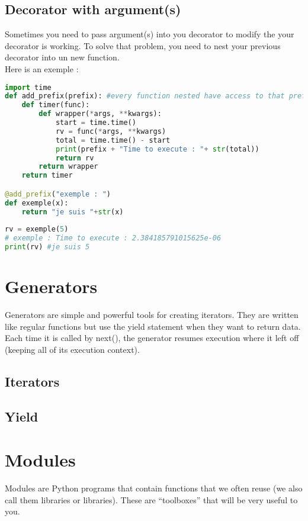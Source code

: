 \documentclass[a4paper, 12pt, titlepage]{scrartcl} %
\begin{document}
\subsection{Decorator with argument(s)}
Sometimes you need to pass argument(s) into you decorator to modify the your decorator is working. To solve that problem, you need to nest your previous decorator into un new function. \\
Here is an exemple : \\
\begin{lstlisting}[language=Python]
import time
def add_prefix(prefix): #every function nested have access to that prefix
    def timer(func):
    	def wrapper(*args, **kwargs):
    		start = time.time()
    		rv = func(*args, **kwargs)
    		total = time.time() - start
    		print(prefix + "Time to execute : "+ str(total))
    		return rv
    	return wrapper
    return timer

@add_prefix("exemple : ")
def exemple(x):
	return "je suis "+str(x)
	
rv = exemple(5)
# exemple : Time to execute : 2.384185791015625e-06
print(rv) #je suis 5
\end{lstlisting}

\newpage
\section{Generators}
\label{sec:Generators}
Generators are simple and powerful tools for creating iterators. They are written like regular functions but use the yield statement when they want to return data. Each time it is called by next(), the generator resumes execution where it left off (keeping all of its execution context).\newline
\subsection{Iterators}
\subsection{Yield}

\newpage
\section{Modules}
Modules are Python programs that contain functions that we often reuse (we also call them libraries or libraries). These are “toolboxes” that will be very useful to you.\newline
\end{document}
